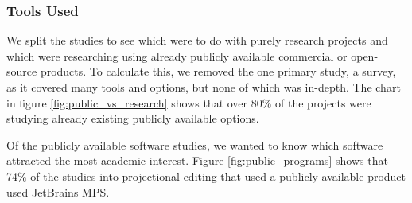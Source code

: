 \subsubsection{Tools Used}
We split the studies to see which were to do with purely research projects and which were researching using already publicly available commercial or open-source products.
To calculate this, we removed the one primary study, a survey, as it covered many tools and options, but none of which was in-depth.
The chart in figure \ref{fig:public_vs_research} shows that over 80\% of the projects were studying already existing publicly available options.

Of the publicly available software studies, we wanted to know which software attracted the most academic interest.
Figure \ref{fig:public_programs} shows that 74\% of the studies into projectional editing that used a publicly available product used JetBrains MPS.

